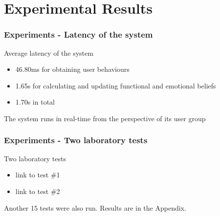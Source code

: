 \documentclass{beamer}
\begin{document}
\section{Experimental Results}
\begin{frame}
\frametitle{Experiments - Latency of the system}
Average latency of the system
\begin{itemize} 
\item 46.80ms for obtaining user behaviours
\item 1.65s for calculating and updating functional and emotional beliefs
\item 1.70s in total
\end{itemize}
\vspace{.3cm}
The system runs in real-time from the perspective of its user group
\end{frame}

\begin{frame}
\frametitle{Experiments - Two laboratory tests}
Two laboratory tests
\begin{itemize}
\item link to test \#1
\item link to test \#2
\end{itemize}
\vspace{.3cm}
Another 15 tests were also run. Results are in the Appendix.
\end{frame}
\end{document}
